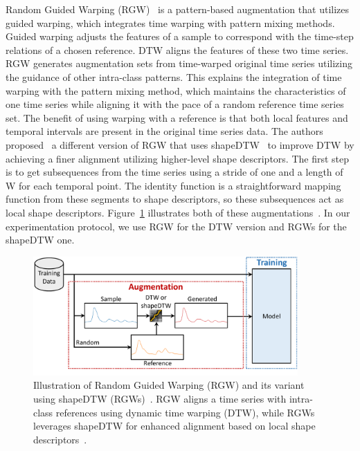 Random Guided Warping (RGW)~\cite{Um_2017} is a pattern-based augmentation that utilizes guided warping, which integrates time warping with pattern mixing methods. Guided warping adjusts the features of a sample to correspond with the time-step relations of a chosen reference. DTW aligns the features of these two time series. RGW generates augmentation sets from time-warped original time series utilizing the guidance of other intra-class patterns. This explains the integration of time warping with the pattern mixing method, which maintains the characteristics of one time series while aligning it with the pace of a random reference time series set. The benefit of using warping with a reference is that both local features and temporal intervals are present in the original time series data. The authors proposed  a different version of RGW that uses shapeDTW~\cite{ZHAO2018171} to improve DTW by achieving a finer alignment utilizing higher-level shape descriptors. The first step is to get subsequences from the time series using a stride of one and a length of W for each temporal point. The identity function is a straightforward mapping function from these segments to shape descriptors, so these subsequences act as local shape descriptors. Figure~\ref{fig:rgw} illustrates both of these augmentations~\cite{10.1371/journal.pone.0254841, iwana2020timeseriesdataaugmentation, ZHAO2018171}. In our experimentation protocol, we use RGW for the DTW version and RGWs for the shapeDTW one.




\begin{figure}[h!]
    \centering
    \includegraphics[page=1, width=0.9\textwidth]{./images/diagram_random.pdf}
\caption{Illustration of Random Guided Warping (RGW) and its variant using shapeDTW (RGWs)~\cite{iwana2020timeseriesdataaugmentation}. RGW aligns a time series with intra-class references using dynamic time warping (DTW), while RGWs leverages shapeDTW for enhanced alignment based on local shape descriptors~\cite{ZHAO2018171}.}
    \label{fig:rgw}
\end{figure}


